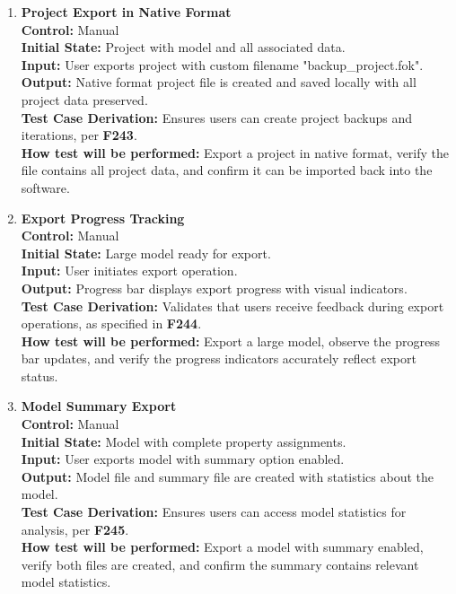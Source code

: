\documentclass[12pt, titlepage]{article}
\begin{document}
\begin{enumerate}
  \item \textbf{Project Export in Native Format} \\[2mm]
    \textbf{Control:} Manual \\ 
    \textbf{Initial State:} Project with model and all associated data. \\ 
    \textbf{Input:} User exports project with custom filename "backup\_project.fok". \\ 
    \textbf{Output:} Native format project file is created and saved locally with all project data preserved. \\[2mm]
    \textbf{Test Case Derivation:} Ensures users can create project backups and iterations, per \textbf{F243}. \\[2mm]
    \textbf{How test will be performed:} Export a project in native format, verify the file contains all project data, and confirm it can be imported back into the software.

  \item \textbf{Export Progress Tracking} \\[2mm]
    \textbf{Control:} Manual \\ 
    \textbf{Initial State:} Large model ready for export. \\ 
    \textbf{Input:} User initiates export operation. \\ 
    \textbf{Output:} Progress bar displays export progress with visual indicators. \\[2mm]
    \textbf{Test Case Derivation:} Validates that users receive feedback during export operations, as specified in \textbf{F244}. \\[2mm]
    \textbf{How test will be performed:} Export a large model, observe the progress bar updates, and verify the progress indicators accurately reflect export status.

  \item \textbf{Model Summary Export} \\[2mm]
    \textbf{Control:} Manual \\ 
    \textbf{Initial State:} Model with complete property assignments. \\ 
    \textbf{Input:} User exports model with summary option enabled. \\ 
    \textbf{Output:} Model file and summary file are created with statistics about the model. \\[2mm]
    \textbf{Test Case Derivation:} Ensures users can access model statistics for analysis, per \textbf{F245}. \\[2mm]
    \textbf{How test will be performed:} Export a model with summary enabled, verify both files are created, and confirm the summary contains relevant model statistics.


\end{enumerate}
\end{document}
